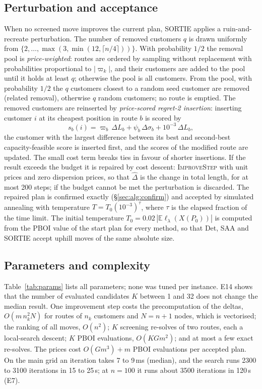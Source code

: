 \documentclass[11pt]{article}
\theoremstyle{definition}
\newcommand{\E}{\mathbb{E}}
\newcommand{\lord}{\ell_\lambda}
\begin{document}
\subsection{Perturbation and acceptance}\label{sec:alg:perturb}
When no screened move improves the current plan, SORTIE applies a
ruin-and-recreate perturbation. The number of removed customers $q$ is drawn
uniformly from $\{2,\dots,\max(3,\min(12,\lceil n/4\rceil))\}$. With
probability $1/2$ the removal pool is \emph{price-weighted}: routes are
ordered by sampling without replacement with probabilities proportional to
$|\varpi_k|$, and their customers are added to the pool until it holds at
least $q$; otherwise the pool is all customers. From the pool, with
probability $1/2$ the $q$ customers closest to a random seed customer are
removed (related removal), otherwise $q$ random customers; no route is
emptied. The removed customers are reinserted by \emph{price-scored regret-2
insertion}: inserting customer $i$ at its cheapest position in route $b$ is
scored by
\[
s_b(i)=\varpi_b\,\Delta L_b+\psi_b\,\Delta\sigma_b+10^{-3}\,\Delta L_b,
\]
the customer with the largest difference between its best and second-best
capacity-feasible score is inserted first, and the scores of the modified
route are updated. The small cost term breaks ties in favour of shorter
insertions. If the result exceeds the budget it is repaired by cost descent:
\textsc{ImproveStep} with unit prices and zero dispersion prices, so that
$\hat\Delta$ is the change in total length, for at most 200 steps; if the
budget cannot be met the perturbation is discarded. The repaired plan is
confirmed exactly (\S\ref{sec:alg:confirm}) and accepted by simulated
annealing with temperature $T=T_0(10^{-3})^{\tau}$, where $\tau$ is the
elapsed fraction of the time limit. The initial temperature
$T_0=0.02\,|\E\lord(X(P_0))|$ is computed from the PBOI value of the start
plan for every method, so that Det, SAA and SORTIE accept uphill moves of the
same absolute size.

\subsection{Parameters and complexity}\label{sec:alg:params}
Table~\ref{tab:params} lists all parameters; none was tuned per instance.
E14 shows that the number of evaluated candidates $K$ between 1 and 32 does not
change the median result. One improvement step costs the precomputation of
the deltas, $O(m\,n_k^2N)$ for routes of $n_k$ customers and $N=n+1$ nodes,
which is vectorised; the ranking of all moves, $O(n^2)$; $K$ screening
re-solves of two routes, each a local-search descent; $K$ PBOI evaluations,
$O(KGm^2)$; and at most a few exact re-solves. The prices cost
$O(Gm^3)+m$ PBOI evaluations per accepted plan. On the main grid an iteration takes 7 to 9\,ms (median), and the search
runs 2300 to 3100 iterations in 15 to 25\,s; at $n=100$ it runs about 3500
iterations in 120\,s (E7).
\end{document}
